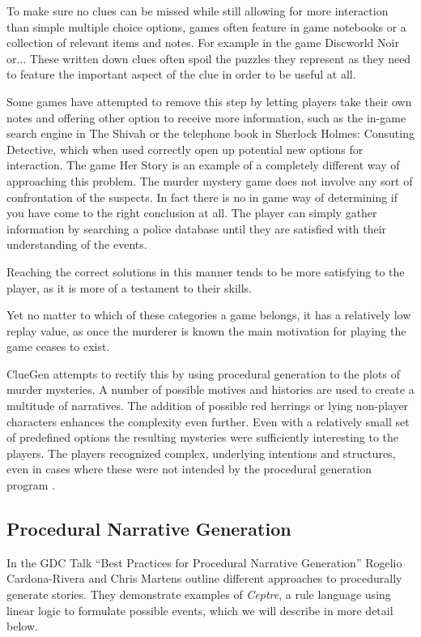 To make sure no clues can be missed while still allowing for more interaction than simple multiple choice options, games often feature in game notebooks or a collection of relevant items and notes.
For example in the game Discworld Noir or...
These written down clues often spoil the puzzles they represent as they need to feature the important aspect of the clue in order to be useful at all.

Some games have attempted to remove this step by letting players take their own notes and offering other option to receive more information, such as the in-game search engine in The Shivah or the telephone book in Sherlock Holmes: Consuting Detective, which when used correctly open up potential new options for interaction.
The game Her Story is an example of a completely different way of approaching this problem.
The murder mystery game does not involve any sort of confrontation of the suspects.
In fact there is no in game way of determining if you have come to the right conclusion at all.
The player can simply gather information by searching a police database until they are satisfied with their understanding of the events.

Reaching the correct solutions in this manner tends to be more satisfying to the player, as it is more of a testament to their skills.

Yet no matter to which of these categories a game belongs, it has a relatively low replay value, as once the murderer is known the main motivation for playing the game ceases to exist.

ClueGen attempts to rectify this by using procedural generation to the plots of murder mysteries.
A number of possible motives and histories are used to create a multitude of narratives.
The addition of possible red herrings or lying non-player characters enhances the complexity even further.
Even with a relatively small set of predefined options the resulting mysteries were sufficiently interesting to the players.
The players recognized complex, underlying intentions and structures, even in cases where these were not intended by the procedural generation program \cite{AIIDE1614070}.

\subsection{Procedural Narrative Generation}

In the GDC Talk \enquote{Best Practices for Procedural Narrative Generation} Rogelio Cardona-Rivera and Chris Martens outline different approaches to procedurally generate stories.
They demonstrate examples of \emph{Ceptre}, a rule language using linear logic to formulate possible events, which we will describe in more detail below.

